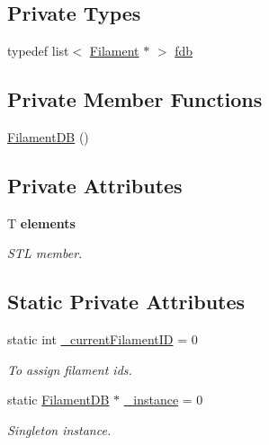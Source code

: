 \subsection*{Private Types}
\begin{DoxyCompactItemize}
\item 
typedef list$<$ \hyperlink{classFilament}{Filament} $\ast$ $>$ \hyperlink{classFilamentDB_ad4dab72a17f9ca811b1394d016ff6919}{fdb}
\end{DoxyCompactItemize}
\subsection*{Private Member Functions}
\begin{DoxyCompactItemize}
\item 
\hyperlink{classFilamentDB_aea94e0951b04cb5c159e1b82e4234aa6}{Filament\+D\+B} ()
\end{DoxyCompactItemize}
\subsection*{Private Attributes}
\begin{DoxyCompactItemize}
\item 
T {\bfseries elements}
\begin{DoxyCompactList}\small\item\em S\+T\+L member. \end{DoxyCompactList}\end{DoxyCompactItemize}
\subsection*{Static Private Attributes}
\begin{DoxyCompactItemize}
\item 
static int \hyperlink{classFilamentDB_aa1d24417c23d969d25de7313d1515efe}{\+\_\+current\+Filament\+I\+D} = 0
\begin{DoxyCompactList}\small\item\em To assign filament ids. \end{DoxyCompactList}\item 
static \hyperlink{classFilamentDB}{Filament\+D\+B} $\ast$ \hyperlink{classFilamentDB_ac70b0695a1d08e39975e601f34330bb7}{\+\_\+instance} = 0
\begin{DoxyCompactList}\small\item\em Singleton instance. \end{DoxyCompactList}\end{DoxyCompactItemize}


